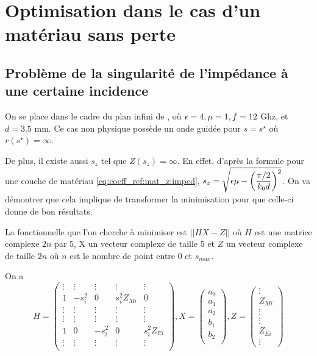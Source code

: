 \section{Optimisation dans le cas d'un matériau sans perte}

\subsection{Problème de la singularité de l'impédance à une certaine incidence}
On se place dans le cadre du plan infini de \cite{soudais_3d_2017}, où $\epsilon=4,\mu=1,f=12$ Ghz, et $d=3.5$ mm. Ce cas non physique possède un onde guidée pour $s=s^\star$ où $r(s^\star) = \infty$. 

De plus, il existe aussi $s_z$ tel que $Z(s_z) = \infty$. En effet, d'après la formule pour une couche de matériau \eqref{eq:coeff_ref:mat_z:imped}, $s_z = \sqrt{\epsilon \mu - \left(\dfrac{\pi/2}{k_0 d}\right)^2}$. On va démontrer que cela implique de transformer la minimisation pour que celle-ci donne de bon résultats.

La fonctionnelle que l'on cherche à minimiser est $||H X - Z||$ où $H$ est une matrice complexe $2n$ par 5, X un vecteur complexe de taille 5 et $Z$ un vecteur complexe de taille $2n$ où $n$ est le nombre de point entre 0 et $s_{max}$. 


On a 
\[
  H = \begin{pmatrix}
  \vdots & \vdots & \vdots & \vdots &\vdots \\
  1 & -s_i^2 & 0 & s_i^2 Z_{Mi} & 0 \\
  \vdots & \vdots & \vdots & \vdots &\vdots \\
  \vdots & \vdots & \vdots & \vdots &\vdots \\
  1 & 0 &-s_i^2 & 0 & s_i^2 Z_{Ei} \\
  \vdots & \vdots & \vdots & \vdots &\vdots \\
  \end{pmatrix},
  X = \begin{pmatrix}
  a_0\\
  a_1\\
  a_2\\
  b_1\\
  b_2\\
  \end{pmatrix},
  Z=\begin{pmatrix}
  \vdots\\
  Z_{Mi}\\
  \vdots\\
  \vdots\\
  Z_{Ei}\\
  \vdots
  \end{pmatrix}
\]

